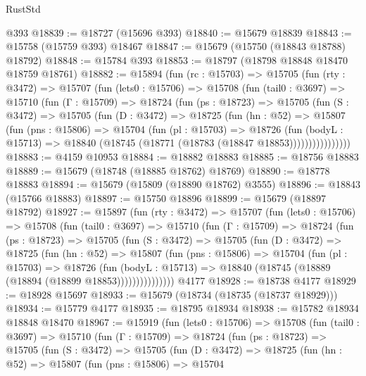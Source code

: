 \begin{lexlean}{RustStd}
\begin{coremodule}
    @393
@18839 := @18727 (@15696 @393)
@18840 := @15679 @18839
@18843 := @15758 (@15759 @393) @18467
@18847 := @15679 (@15750 (@18843 @18788) @18792)
@18848 := @15784 @393
@18853 := @18797 (@18798 @18848 @18470 @18759 @18761)
@18882 := @15894
    (fun (rc : @15703) =>
    @15705
      (fun (rty : @3472) =>
      @15707
        (fun (lets0 : @15706) =>
        @15708
          (fun (tail0 : @3697) =>
          @15710
            (fun (Γ : @15709) =>
            @18724
              (fun (ps : @18723) =>
              @15705
                (fun (S : @3472) =>
                @15705
                  (fun (D : @3472) =>
                  @18725
                    (fun (hn : @52) =>
                    @15807
                      (fun (pns : @15806) =>
                      @15704
                        (fun (pl : @15703) =>
                        @18726
                          (fun (bodyL : @15713) =>
                          @18840 (@18745 (@18771 (@18783 (@18847 @18853))))))))))))))))
@18883 := @4159 @10953
@18884 := @18882 @18883
@18885 := @18756 @18883
@18889 := @15679 (@18748 (@18885 @18762) @18769)
@18890 := @18778 @18883
@18894 := @15679 (@15809 (@18890 @18762) @3555)
@18896 := @18843 (@15766 @18883)
@18897 := @15750 @18896
@18899 := @15679 (@18897 @18792)
@18927 := @15897
    (fun (rty : @3472) =>
    @15707
      (fun (lets0 : @15706) =>
      @15708
        (fun (tail0 : @3697) =>
        @15710
          (fun (Γ : @15709) =>
          @18724
            (fun (ps : @18723) =>
            @15705
              (fun (S : @3472) =>
              @15705
                (fun (D : @3472) =>
                @18725
                  (fun (hn : @52) =>
                  @15807
                    (fun (pns : @15806) =>
                    @15704
                      (fun (pl : @15703) =>
                      @18726
                        (fun (bodyL : @15713) =>
                        @18840 (@18745 (@18889 (@18894 (@18899 @18853)))))))))))))))
    @4177
@18928 := @18738 @4177
@18929 := @18928 @15697
@18933 := @15679 (@18734 (@18735 (@18737 @18929)))
@18934 := @15779 @4177
@18935 := @18795 @18934
@18938 := @15782 @18934 @18848 @18470
@18967 := @15919
    (fun (lets0 : @15706) =>
    @15708
      (fun (tail0 : @3697) =>
      @15710
        (fun (Γ : @15709) =>
        @18724
          (fun (ps : @18723) =>
          @15705
            (fun (S : @3472) =>
            @15705
              (fun (D : @3472) =>
              @18725
                (fun (hn : @52) =>
                @15807
                  (fun (pns : @15806) =>
                  @15704

\end{coremodule}
\end{lexlean}

